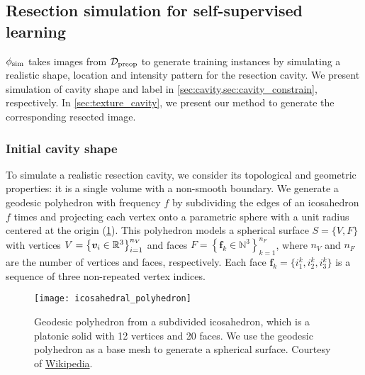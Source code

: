 \subsection{Resection simulation for self-supervised learning}
\label{sec:simulation}

\newcommand{\AAA}{\bm{A}}
\newcommand{\NN}{\mathcal{N}}


$\phi_{\text{sim}}$ takes images from $\mathcal{D}_{\text{preop}}$ to generate training instances by simulating a realistic shape, location and intensity pattern for the resection cavity.
We present simulation of cavity shape and label in \cref{sec:cavity,sec:cavity_constrain}, respectively.
In \cref{sec:texture_cavity}, we present our method to generate the corresponding resected image.


\subsubsection{Initial cavity shape}
\label{sec:cavity}

To simulate a realistic resection cavity, we consider its topological and geometric properties: it is a single volume with a non-smooth boundary.
We generate a geodesic polyhedron with frequency $f$ by subdividing the edges of an icosahedron $f$ times and projecting each vertex onto a parametric sphere with a unit radius centered at the origin (\cref{fig:icosahedron}).
This polyhedron models a spherical surface $S = \{ V, F \}$ with vertices
$
  V = \left\{
    \bm{v}_i \in \mathbb{R}^3
  \right\}
  _{i = 1}^{n_V}
$
and faces
$
  F = \left\{
    \bm{f}_k \in \mathbb{N}^3
  \right\}
  _{k = 1}^{n_F}
$, where $n_V$ and $n_F$ are the number of vertices and faces, respectively.
%
Each face $\bm{f}_k = \{ i_1^k, i_2^k, i_3^k \}$ is a sequence of three non-repeated vertex indices.

\begin{figure}
  \centering
  \texttt{[image: icosahedral\_polyhedron]}
  \caption[Geodesic polyhedron from a subdivided icosahedron]{
    Geodesic polyhedron from a subdivided icosahedron, which is a platonic solid with 12 vertices and 20 faces.
    We use the geodesic polyhedron as a base mesh to generate a spherical surface.
    Courtesy of \href{https://en.wikipedia.org/wiki/Geodesic_polyhedron}{Wikipedia}.
  }
  \label{fig:icosahedron}
\end{figure}

